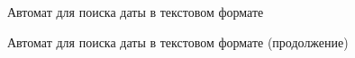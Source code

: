 \documentclass[a4paper, 14pt]{article}
\begin{document}
    	\begin{figure}[!ht]
        	\caption{Автомат для поиска даты в текстовом формате}
        	\label{fig:schema_vinograd_optimized}
        \end{figure}
        \newpage
        \begin{figure}[!ht]
        	\caption{Автомат для поиска даты в текстовом формате (продолжение)}
        	\label{fig:schema_vinograd_optimized}
        \end{figure}
        \newpage     
\end{document}
